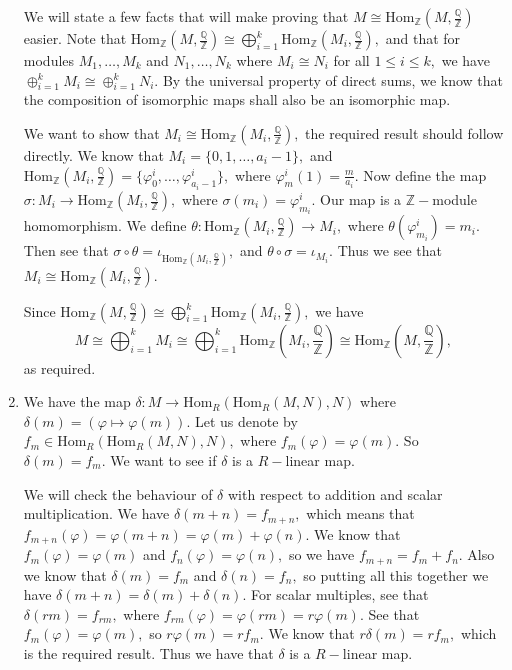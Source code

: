 \documentclass{article}
\begin{document}
\begin{enumerate}
	We will state a few facts that will make proving that $M \cong \text{Hom}_{\mathbb{Z}}\left(M,\frac{\mathbb{Q}}{\mathbb{Z}}\right)$ easier. Note that 
	$\text{Hom}_{\mathbb{Z}}\left(M,\frac{\mathbb{Q}}{\mathbb{Z}}\right) \cong 
	\bigoplus_{i=1}^{k}\text{Hom}_{\mathbb{Z}}\left(M_i,\frac{\mathbb{Q}}{\mathbb{Z}}\right),$ and that for modules $M_1,\dots,M_k$ and $N_1, \dots, N_k$ 
	where $M_i \cong N_i$ for all $1 \leq i \leq k,$ we have $\oplus_{i=1}^{k}M_i \cong \oplus_{i=1}^k N_i.$ By the universal property of direct sums, we 
	know that the composition of isomorphic maps shall also be an isomorphic map.
	
	We want to show that $ M_i \cong \text{Hom}_{\mathbb{Z}}\left(M_i,\frac{\mathbb{Q}}{\mathbb{Z}}\right),$ the required result should follow directly. We 
	know that $M_i=\{0,1,\dots,a_i-1\},$ and $\text{Hom}_{\mathbb{Z}}\left(M_i,\frac{\mathbb{Q}}{\mathbb{Z}}\right)=\{\varphi^i_0,\dots, 
	\varphi^i_{a_i-1}\},$ where $\varphi^i_{m}(1)=\frac{m}{a_i}.$ Now define the map $\sigma: M_i \rightarrow 
	\text{Hom}_{\mathbb{Z}}\left(M_i,\frac{\mathbb{Q}}{\mathbb{Z}}\right),$ where $\sigma(m_i)= \varphi^i_{m_i}.$ Our map is a $\mathbb{Z}-$module 
	homomorphism. We define $\theta:\text{Hom}_{\mathbb{Z}}\left(M_i,\frac{\mathbb{Q}}{\mathbb{Z}}\right)  \rightarrow M_i,$ where 
	$\theta(\varphi^i_{m_i})=m_i.$ Then see that $\sigma \circ \theta= \iota_{\text{Hom}_{\mathbb{Z}}\left(M_i,\frac{\mathbb{Q}}{\mathbb{Z}}\right) },$ and 
	$\theta \circ \sigma = \iota_{M_i}.$ Thus we see that  $M_i \cong \text{Hom}_{\mathbb{Z}}\left(M_i,\frac{\mathbb{Q}}{\mathbb{Z}}\right).$ 
	
	Since $\text{Hom}_{\mathbb{Z}}\left(M,\frac{\mathbb{Q}}{\mathbb{Z}}\right) \cong 
	\bigoplus_{i=1}^{k}\text{Hom}_{\mathbb{Z}}\left(M_i,\frac{\mathbb{Q}}{\mathbb{Z}}\right),$ we have $$M \cong \bigoplus_{i=1}^k M_i \cong 
	\bigoplus_{i=1}^{k}\text{Hom}_{\mathbb{Z}}\left(M_i,\frac{\mathbb{Q}}{\mathbb{Z}}\right) \cong 
	\text{Hom}_{\mathbb{Z}}\left(M,\frac{\mathbb{Q}}{\mathbb{Z}}\right) ,$$ as required. 
	
	\item We have the map $\delta: M \rightarrow \text{Hom}_{R}\left(\text{Hom}_{R}\left(M, N\right),N \right)$ where $\delta(m)= (\varphi 
	\mapsto \varphi(m)).$ Let us denote by $f_m \in \text{Hom}_{R}\left(\text{Hom}_{R}\left(M, N\right),N \right),$ where 
	$f_m(\varphi)=\varphi(m).$ So $\delta(m)=f_m.$ We want to see if $\delta$ is a $R-$linear map. 
	
	We will check the behaviour of $\delta$ with respect to addition and scalar multiplication. We have $\delta(m+n)=f_{m+n},$ which means that 
	$f_{m+n}(\varphi)=\varphi(m+n)=\varphi(m)+\varphi(n).$ We know that $f_m(\varphi)=\varphi(m)$ and $f_n(\varphi)=\varphi(n),$ so we have $f_{m+n}=f_m + 
	f_n$.  Also we know that 
	$\delta(m)=f_m$ and $\delta(n)=f_n,$ so putting all this together we have $\delta(m+n)=\delta(m)+\delta(n).$ For scalar multiples, see that 
	$\delta(rm)=f_{rm},$ where $f_{rm}(\varphi)=\varphi(rm)=r\varphi(m).$ See that $f_m(\varphi)=\varphi(m),$ so $r\varphi(m)=rf_m.$ We know that 
	$r\delta(m)=rf_m,$ which is 
	the required result. Thus we have that $\delta$ is a $R-$linear map. 
	

\end{enumerate}
\end{document}
